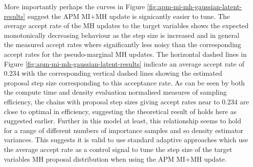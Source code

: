 More importantly perhaps the curves in Figure \ref{fig:apm-mi-mh-gaussian-latent-results} suggest the \ac{APM} \ac{MI}+\ac{MH} update is signicantly easier to tune. The average accept rate of the \ac{MH} updates to the target variables shows the expected monotonically decreasing behaviour as the step size is increased and in general the measured accept rates where significantly less noisy than the corresponding accept rates for the pseudo-marginal \ac{MH} updates. The horizontal dashed lines in Figure \ref{fig:apm-mi-mh-gaussian-latent-results} indicate an average accept rate of 0.234 with the corresponding vertical dashed lines showing the estimated proposal step size corresponding to this acceptance rate. As can be seen by both the compute time and density evaluation normalised measures of sampling efficiency, the chains with proposal step sizes giving accept rates near to 0.234 are close to optimal in efficiency, suggesting the theoretical result of \citep{gelman1997weak} holds here as suggested earlier. Further in this model at least, this relationship seems to hold for a range of different numbers of importance samples and so density estimator variances. This suggests it is valid to use standard adaptive approaches which use the average accept rate as a control signal to tune the step size of the target variables \ac{MH} proposal distribution when using the \ac{APM} \ac{MI}+\ac{MH} update.

